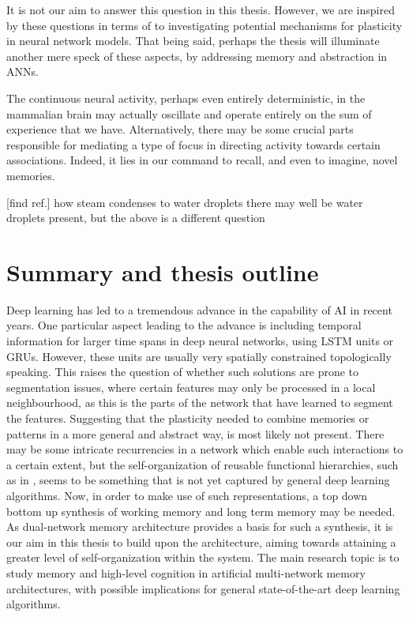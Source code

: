It is not our aim to answer this question in this thesis. However, we are inspired by these questions in terms of to investigating potential mechanisms for plasticity in neural network models. That being said, perhaps the thesis will illuminate another mere speck of these aspects, by addressing memory and abstraction in ANNs.

The continuous neural activity, perhaps even entirely deterministic, in the mammalian brain may actually oscillate and operate entirely on the sum of experience that we have. Alternatively, there may be some crucial parts responsible for mediating a type of focus in directing activity towards certain associations. Indeed, it lies in our command to recall, and even to imagine, novel memories.

[find ref.] how steam condenses to water droplets
there may well be water droplets present, but the above is a different question

\section{Summary and thesis outline}

Deep learning has led to a tremendous advance in the capability of AI in recent years. One particular aspect leading to the advance is including temporal information for larger time spans in deep neural networks, using LSTM units or GRUs. However, these units are usually very spatially constrained topologically speaking. This raises the question of whether such solutions are prone to segmentation issues, where certain features may only be processed in a local neighbourhood, as this is the parts of the network that have learned to segment the features. Suggesting that the plasticity needed to combine memories or patterns in a more general and abstract way, is most likely not present. There may be some intricate recurrencies in a network which enable such interactions to a certain extent, but the self-organization of reusable functional hierarchies, such as in \cite{Tani2014}, seems to be something that is not yet captured by general deep learning algorithms. Now, in order to make use of such representations, a top down bottom up synthesis of working memory and long term memory may be needed. As dual-network memory architecture provides a basis for such a synthesis, it is our aim in this thesis to build upon the architecture, aiming towards attaining a greater level of self-organization within the system. 
The main research topic is to study memory and high-level cognition in artificial multi-network memory architectures, with possible implications for general state-of-the-art deep learning algorithms.


